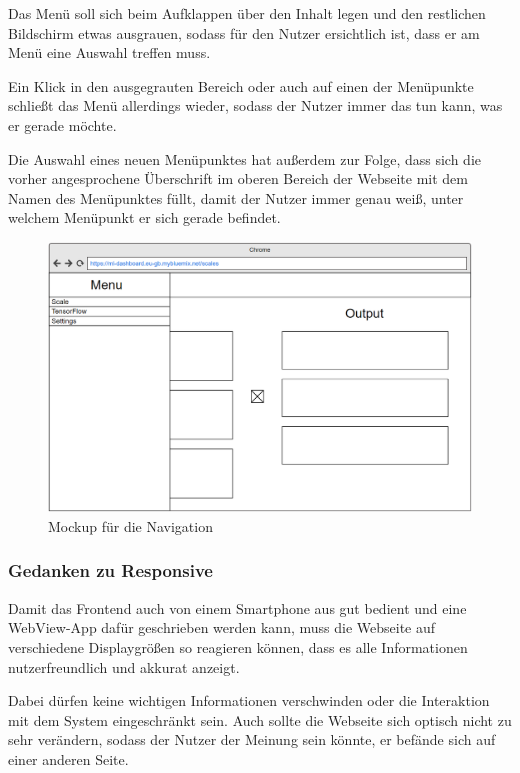 Das Menü soll sich beim Aufklappen über den Inhalt legen und den restlichen Bildschirm etwas ausgrauen, sodass für den
Nutzer ersichtlich ist, dass er am Menü eine Auswahl treffen muss.

Ein Klick in den ausgegrauten Bereich oder auch auf einen der Menüpunkte schließt das Menü allerdings wieder, sodass
der Nutzer immer das tun kann, was er gerade möchte.

Die Auswahl eines neuen Menüpunktes hat außerdem zur Folge, dass sich die vorher angesprochene Überschrift im oberen
Bereich der Webseite mit dem Namen des Menüpunktes füllt, damit der Nutzer immer genau weiß, unter welchem Menüpunkt
er sich gerade befindet.

\begin{figure}[h]
    \centering
    \includegraphics[width=\textwidth]{images/kapitel_4/mockup_scale_menu.png}
    \caption{Mockup für die Navigation}
    \label{fig:umsetzung_mockup_scale_menu}
\end{figure}

\subsubsection{Gedanken zu Responsive}
Damit das Frontend auch von einem Smartphone aus gut bedient und eine WebView-App dafür geschrieben werden kann, muss
die Webseite auf verschiedene Displaygrößen so reagieren können, dass es alle Informationen nutzerfreundlich und
akkurat anzeigt.

Dabei dürfen keine wichtigen Informationen verschwinden oder die Interaktion mit dem System eingeschränkt sein. Auch
sollte die Webseite sich optisch nicht zu sehr verändern, sodass der Nutzer der Meinung sein könnte, er befände sich auf
einer anderen Seite.

